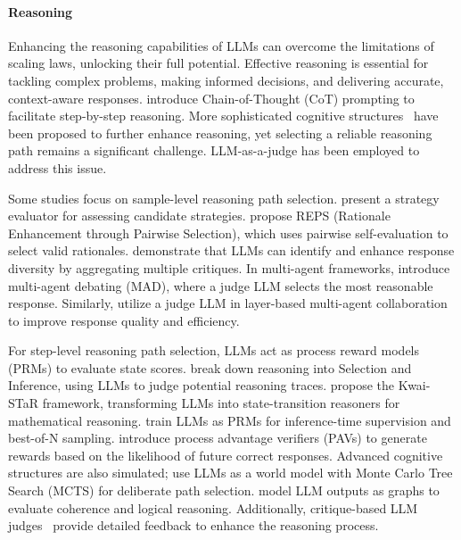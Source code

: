 \paragraph{\textbf{Reasoning}}  
Enhancing the reasoning capabilities of LLMs can overcome the limitations of scaling laws, unlocking their full potential. Effective reasoning is essential for tackling complex problems, making informed decisions, and delivering accurate, context-aware responses. 
\citet{cot} introduce Chain-of-Thought (CoT) prompting to facilitate step-by-step reasoning. More sophisticated cognitive structures~\cite{yao2023tree,hao2023reasoning} have been proposed to further enhance reasoning, yet selecting a reliable reasoning path remains a significant challenge. LLM-as-a-judge has been employed to address this issue.

Some studies focus on sample-level reasoning path selection. \citet{gao2023strategyllm} present a strategy evaluator for assessing candidate strategies. \citet{kawabata2024rationale} propose REPS (Rationale Enhancement through Pairwise Selection), which uses pairwise self-evaluation to select valid rationales. \citet{lahoti2023improving} demonstrate that LLMs can identify and enhance response diversity by aggregating multiple critiques. In multi-agent frameworks, \citet{liang2023encouraging} introduce multi-agent debating (MAD), where a judge LLM selects the most reasonable response. Similarly, \citet{li2024smoa} utilize a judge LLM in layer-based multi-agent collaboration to improve response quality and efficiency.

For step-level reasoning path selection, LLMs act as process reward models (PRMs) to evaluate state scores. \citet{creswell2022selection} break down reasoning into Selection and Inference, using LLMs to judge potential reasoning traces. \citet{xie2024improving} propose the Kwai-STaR framework, transforming LLMs into state-transition reasoners for mathematical reasoning. \citet{let_verify_step} train LLMs as PRMs for inference-time supervision and best-of-N sampling. \citet{setlur2024rewarding} introduce process advantage verifiers (PAVs) to generate rewards based on the likelihood of future correct responses. Advanced cognitive structures are also simulated; \citet{hao2023reasoning} use LLMs as a world model with Monte Carlo Tree Search (MCTS) for deliberate path selection. \citet{besta2024graph} model LLM outputs as graphs to evaluate coherence and logical reasoning.
Additionally, critique-based LLM judges~\cite{ankner2024critique,lancriticeval,yao2024mcqg,yuksel2024multi} provide detailed feedback to enhance the reasoning process.

